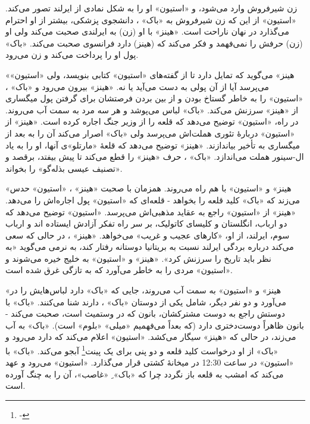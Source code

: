 \documentclass[12pt]{book}
\newcommand{\noun}[1]{«{#1}»}
\begin{document}
    زن شیرفروش وارد می‌شود، و \noun{استیون} او را به شکل نمادی از ایرلند تصور می‌کند. \noun{استیون} از این که زن شیرفروش به \noun{باک} ، دانشجوی پزشکی، بیشتر از او احترام می‌گذارد در نهان ناراحت است. \noun{هینز}  با او (زن) به ایرلندی صحبت می‌کند ولی او (زن) حرفش را نمی‌فهمد و فکر می‌کند که (هینز) دارد فرانسوی صحبت می‌کند. \noun{باک}  پول او را پرداخت می‌کند و زن می‌رود.

    \noun{هینز}  می‌گوید که تمایل دارد تا از گفته‌های \noun{استیون} کتابی بنویسد، ولی \noun{استیون} می‌پرسد آیا از آن پولی به دست می‌آید یا نه. \noun{هینز}  بیرون می‌رود و \noun{باک} ، \noun{استیون} را به خاطر گستاخ بودن و از بین بردن فرصتشان برای گرفتن پول میگساری از \noun{هینز}  سرزنش می‌کند. \noun{باک}  لباس می‌پوشد و هر سه مرد به سمت آب می‌روند. در راه، \noun{استیون} توضیح می‌دهد که قلعه را از وزیر جنگ اجاره کرده است. \noun{هینز}  از \noun{استیون} دربارۀ تئوری هملت‌اش می‌پرسد ولی \noun{باک}  اصرار می‌کند آن را به بعد از میگساری به تأخیر بیاندازند. \noun{هینز}  توضیح می‌دهد که قلعۀ \noun{مارتلو}ی آنها، او را به یاد ال-سینور هملت می‌اندازد. \noun{باک} ، حرف \noun{هینز}  را قطع می‌کند تا پیش بیفتد، برقصد و «تصنیف عیسی بذله‌گو» را بخواند.

    \noun{هینز}  و \noun{استیون} با هم راه می‌روند. همزمان با صحبت \noun{هینز} ، \noun{استیون} حدس می‌زند که \noun{باک}  کلید قلعه را بخواهد - قلعه‌ای که \noun{استیون} پول اجاره‌اش را می‌دهد. \noun{هینز}  از \noun{استیون} راجع به عقاید مذهبی‌اش می‌پرسد. \noun{استیون} توضیح می‌دهد که دو ارباب، انگلستان و کلیسای کاتولیک، بر سر راه تفکر آزادش ایستاده اند و ارباب سوم، ایرلند، از او، «کارهای عجیب و غریب» می‌خواهد. \noun{هینز} ، در حالی که سعی می‌کند درباره بردگی ایرلند نسبت به بریتانیا دوستانه رفتار کند، به نرمی می‌گوید «به نظر باید تاریخ را سرزنش کرد». \noun{هینز}  و \noun{استیون} به خلیج خیره می‌شوند و \noun{استیون} مردی را به خاطر می‌آورد که به تازگی غرق شده است.

    \noun{هینز}  و \noun{استیون} به سمت آب می‌روند، جایی که \noun{باک}  دارد لباس‌هایش را در می‌آورد و دو نفر دیگر، شامل یکی از دوستان \noun{باک} ، دارند شنا می‌کنند. \noun{باک}  با دوستش راجع به دوست مشترکشان، بانون که در وستمیث است، صحبت می‌کند - بانون ظاهراً دوست‌دختری دارد (که بعداً می‌فهمیم \noun{میلی} \noun{بلوم} است). \noun{باک}  به آب می‌زند، در حالی که \noun{هینز}  سیگار می‌کشد. \noun{استیون} اعلام می‌کند که دارد می‌رود و \noun{باک}  از او درخواست کلید قلعه و دو پنی برای یک پینت\footnote{-} آبجو می‌کند. \noun{باک}  با \noun{استیون} در ساعت 12:30 در میخانۀ کشتی قرار می‌گذارد. \noun{استیون} می‌رود و عهد می‌کند که امشب به قلعه باز نگردد چرا که \noun{باک} ِ «غاصب»، آن را به چنگ آورده است.
\end{document}
